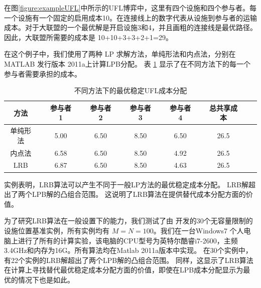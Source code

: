 \documentclass[UTF8]{article}
\begin{document}
\begin{定义}
      在图\ref{figure:exampleUFL}中所示的UFL博弈中，这里有四个设施和四个参与者。每一个设施有一个固定的启用成本10。在连接线上的数字代表从设施到参与者的运输成本。对于大联盟的一个最优解是开启设施3和4，并且画粗的连接线是最优路径。因此，大联盟所需要的成本是 10+10+3+3+2+1=29。

      在这个例子中，我们使用了两种 LP 求解方法，单纯形法和内点法，分别在 MATLAB 发行版本 2011a上计算LPB分配。
      表 \ref{table:UFLCA} 显示了在不同方法下的每一个参与者需要承担的成本。


      \begin{table}[H]
      \vspace{-2mm}
      \centering
      \tabcolsep=4pt
      \small
      \renewcommand\arraystretch{1.5}
      \caption{\label{table:UFLCA} 不同方法下的最优稳定UFL成本分配}
      \begin{tabular}[!h]{c c c c c c c c c c c c c}
      \hline
      \multicolumn{1}{c}{方法}
      &\multicolumn{1}{c}{}
      &\multicolumn{1}{c}{参与者 1}
      &\multicolumn{1}{c}{}
      &\multicolumn{1}{c}{参与者 2}
      &\multicolumn{1}{c}{}
      &\multicolumn{1}{c}{参与者 3} &\multicolumn{1}{c}{}
      &\multicolumn{1}{c}{参与者 4}	&\multicolumn{1}{c}{}
      &\multicolumn{1}{c}{总共享成本}\\
      \hline
      单纯形法	& &5.00	& &6.50	& &8.50	& &6.50	&	&26.5	&\\
      内点法	& &6.58	& &6.50	& &8.50	& &4.92	&	&26.5	&\\
      LRB	& &6.87	& &6.50	& &8.50	& &4.63	&	&26.5	&\\
      \hline
      \end{tabular}
      \vspace{-3mm}
      \end{table}

      实例表明，LRB算法可以产生不同于一般LP方法的最优稳定成本分配。
      LRB解超出了两个LPB解的凸组合范围。
      这说明了LRB算法在提供替代成本分配方面的价值。

      为了研究LRB算法在一般设置下的能力，我们测试了由 \cite{Benchmark} 开发的30个无容量限制的设施位置基准实例，所有实例均有 $ M=N=100$。我们在一台Windows7 个人电脑上进行了所有的计算实验，该电脑的CPU型号为英特尔酷睿i7-2600，主频3.4GHz和内存为16G。所有算法均在Matlab 2011a版本中实现。
      在30个实例中，有22个实例的LRB解超出了两个LPB解的凸组合范围。
      同样，这显示了LRB算法在计算上寻找替代最优稳定成本分配方面的价值，即使在LPB成本分配显示为最优的情况下也是如此。


\end{定义}
\end{document}
